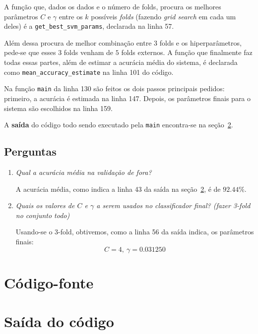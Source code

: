 \documentclass[10pt]{article}
\newcommand{\tit}[1]{\textit{#1}}
\newcommand{\tbf}[1]{\textbf{#1}}
\newcommand{\ttt}[1]{\texttt{#1}}
\begin{document}
A função que, dados os dados e o número de folds, procura os melhores parâmetros
$C$ e $\gamma$ entre os $k$ possíveis \tit{folds} (fazendo \tit{grid search} 
em cada um deles) é a \ttt{get\_best\_svm\_params}, declarada na linha 57.

Além dessa procura de melhor combinação entre $3$ folds e os hiperparâmetros,
pede-se que esses $3$ folds venham de $5$ folds externos. 
A função que finalmente faz todas essas partes, além de estimar a 
acurácia média do sistema, é declarada como \ttt{mean\_accuracy\_estimate} na
linha 101 do código.

Na função \ttt{main} da linha 130 são feitos os dois passos principais pedidos:
primeiro, a acurácia é estimada na linha 147. Depois, os parâmetros finais
para o sistema são escolhidos na linha 159.

A \tbf{saída} do código todo sendo executado pela \ttt{main} encontra-se
na seção~\ref{output}.

\subsection{Perguntas}
\begin{enumerate}
	\item \tit{Qual a acurácia média na validação de fora?}

		A acurácia média, como indica a linha 43 da saída na seção~\ref{output},
		é de $92.44\%$.	

	\item \tit{Quais os valores de $C$ e $\gamma$ a serem usados no
		classificador final? (fazer 3-fold no conjunto todo)}

		Usando-se o 3-fold, obtivemos, como a linha 56 da saída indica,
		os parâmetros finais:
		$$C = 4,~\gamma = 0.031250$$
\end{enumerate}

\newpage

\section{Código-fonte}
\label{code}


\newpage

\section{Saída do código}
\label{output}


\printbibliography
\end{document}
